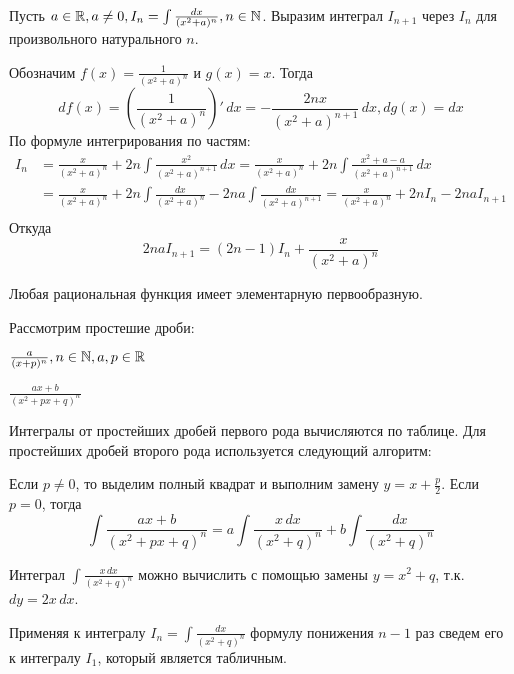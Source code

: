 \begin{Example}
	Пусть $a \in \mathbb{R}, a \neq 0, I_n = \int \frac{dx}{(x^2 + a)^n}, n \in \mathbb{N}$. Выразим интеграл $I_{n + 1}$ через $I_n$ для произвольного натурального $n$.
	
	Обозначим $f(x) = \frac{1}{(x^2 + a)^n}$ и $g(x) = x$. Тогда
	\[df(x) = \left(\frac{1}{(x^2 + a)^n}\right)' \, dx = -\frac{2nx}{(x^2 + a)^{n + 1}} \, dx, dg(x) = dx\]
	По формуле интегрирования по частям:
	\begin{align*}
		I_n &= \frac{x}{(x^2 + a)^n} + 2n \int \frac{x^2}{(x^2 + a)^{n + 1}} \, dx = \frac{x}{(x^2 + a)^n} + 2n \int \frac{x^2 + a - a}{(x^2 + a)^{n + 1}} \, dx \\
		&= \frac{x}{(x^2 + a)^n} + 2n \int \frac{dx}{(x^2 + a)^n} - 2na \int \frac{dx}{(x^2 + a)^{n + 1}} = \frac{x}{(x^2 + a)^n} + 2n I_n - 2na I_{n + 1} \\
	\end{align*}
	Откуда
	\[2na I_{n + 1} = (2n - 1)I_n + \frac{x}{(x^2 + a)^n}\]
\end{Example} 

\begin{Prop}
	Любая рациональная функция имеет элементарную первообразную.
\end{Prop}

Рассмотрим простешие дроби:

\begin{MyList}
	\item $\frac{a}{(x + p)^n}, n \in \mathbb{N}, a, p \in \mathbb{R}$ 
	\item $ \frac{ax + b}{(x^2 + px + q)^n}$ 
\end{MyList}

Интегралы от простейших дробей первого рода вычисляются по таблице. Для простейших дробей второго рода используется следующий алгоритм:

\begin{MyList}
	\item Если $p \neq 0$, то выделим полный квадрат и выполним замену $y = x + \frac{p}{2}$. Если $p = 0$, тогда
	\[\int \frac{ax + b}{(x^2 + px + q)^n} = a\int \frac{x \,dx}{(x^2 + q)^n} + b \int \frac{dx}{(x^2 + q)^n}\]
	\item Интеграл $\int \frac{x \, dx}{(x^2 + q)^n}$ можно вычислить с помощью замены $y = x^2 + q$, т.к. $dy = 2x \, dx$.
	\item Применяя к интегралу $I_n = \int \frac{dx}{(x^2 + q)^n}$ формулу понижения $n - 1$ раз сведем его к интегралу $I_1$, который является табличным.
\end{MyList}

